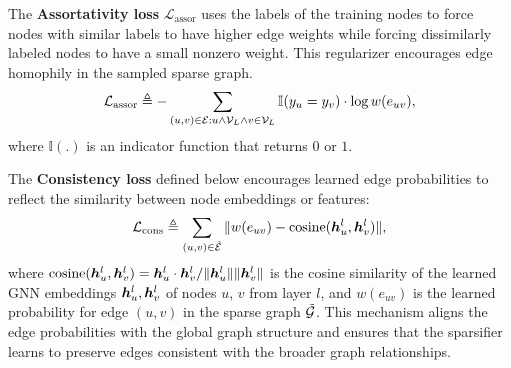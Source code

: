 The \textbf{Assortativity loss} $\mathcal{L}_\mathrm{assor}$ uses the labels of the training nodes to force nodes with similar labels to have higher edge weights while forcing dissimilarly labeled nodes to have a small nonzero weight. This regularizer encourages edge homophily in the sampled sparse graph.
\vspace{-7pt}
\begin{equation}
\small
     \mathcal{L}_\mathrm{assor} \triangleq -\sum_{(u,v) \in {\mathcal{E}}:u \land {\mathcal{V}}_L \land v \in {\mathcal{V}}_L} \mathbb{I}(y_u=y_v)\cdot \log w(e_{uv}),
\end{equation}
where $\mathbb{I}(.)$ is an indicator function that returns $0$ or $1$. 

The \textbf{Consistency loss} defined below encourages learned edge probabilities to reflect the similarity between node embeddings or features:
\vspace{-8pt}
\begin{equation}
\mathcal{L}_\mathrm{cons} \triangleq \sum_{(u,v) \in \tilde{{\mathcal{E}}}} \|w(e_{uv}) - \mathrm{cosine}({\bm{h}}_u^l,{\bm{h}}_v^l)\|,
\end{equation}
where $\mathrm{cosine}({\bm{h}}_u^l,{\bm{h}}_v^l) = {{\bm{h}}_u^l\cdot {\bm{h}}_v^l}/{\|{\bm{h}}_u^l\|\|{\bm{h}}_v^l\|}$ is the cosine similarity of the learned GNN embeddings ${\bm{h}}_u^l,{\bm{h}}_v^l$ of nodes $u$, $v$ from layer $l$, and $w(e_{uv})$ is the learned probability for edge $(u,v)$ in the sparse graph $\tilde{{\mathcal{G}}}$. This mechanism aligns the edge probabilities with the global graph structure and ensures that the sparsifier learns to preserve edges consistent with the broader graph relationships. 
% 


